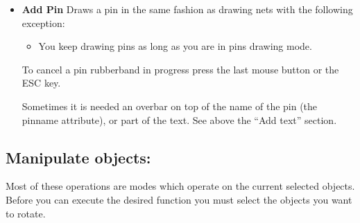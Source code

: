 \documentclass{article}
\begin{document}
\begin{itemize}
\item {\bf Add Pin} Draws a pin in the same fashion as drawing nets
  with the following exception:
\begin{itemize}  
\item You keep drawing pins as long as you are in pins drawing mode.
  \end{itemize}
  To cancel a pin rubberband in progress press the last mouse button
  or the ESC key.

  Sometimes it is needed an overbar on top of the name of the pin (the pinname attribute), or part of the text. See above the ``Add text'' section.

\end{itemize}

\subsection{Manipulate objects:}
Most of these operations are modes which operate on the current
selected objects.  Before you can execute the desired function you
must select the objects you want to rotate.
\end{document}
